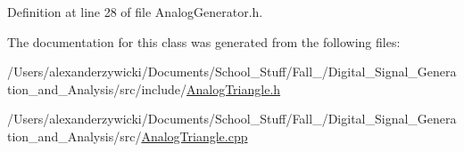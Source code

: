 Definition at line 28 of file Analog\+Generator.\+h.



The documentation for this class was generated from the following files\+:\begin{DoxyCompactItemize}
\item 
/\+Users/alexanderzywicki/\+Documents/\+School\+\_\+\+Stuff/\+Fall\+\_/\+Digital\+\_\+\+Signal\+\_\+\+Generation\+\_\+and\+\_\+\+Analysis/src/include/\hyperlink{AnalogTriangle_8h}{Analog\+Triangle.\+h}\item 
/\+Users/alexanderzywicki/\+Documents/\+School\+\_\+\+Stuff/\+Fall\+\_/\+Digital\+\_\+\+Signal\+\_\+\+Generation\+\_\+and\+\_\+\+Analysis/src/\hyperlink{AnalogTriangle_8cpp}{Analog\+Triangle.\+cpp}\end{DoxyCompactItemize}
